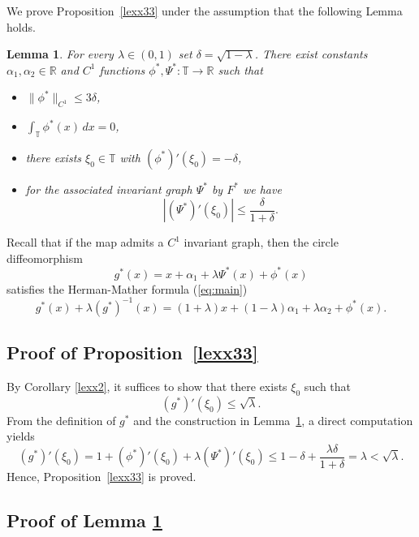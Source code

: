 \documentclass{amsart}
\newcommand{\T}{\mathbb{T}}
\newtheorem{Lemma}[Definition]{Lemma}
\begin{document}
	
	
	
	
	
	
	
	We prove Proposition~\ref{lexx33} under the assumption that the following Lemma holds.
	
	\begin{Lemma}\label{16p}
		For every $\lambda\in(0,1)$ set $\delta=\sqrt{1-\lambda}$.
		There exist constants $\alpha_1,\alpha_2\in\mathbb{R}$ and $C^1$ functions
		$\phi^*,\Psi^*:\T\to\mathbb{R}$ such that
		\begin{itemize}
			\item[(i)] $\|\phi^*\|_{C^1}\le 3\delta$,
			\item[(ii)] $\displaystyle\int_{\T}\phi^*(x)\,dx=0$,
			\item[(iii)] there exists $\xi_0\in\T$ with $\left(\phi^*\right)'(\xi_0)=-\delta$,
			\item[(iv)] for the associated invariant graph $\Psi^*$ by $F^*$ we have
			\[
			|\left(\Psi^*\right)'(\xi_0)|\le\frac{\delta}{1+\delta}.
			\]
		\end{itemize}
	\end{Lemma}
	Recall that if the map admits a $C^1$ invariant graph, then the circle diffeomorphism
	\begin{equation}\label{dfg}
		g^*(x)=x+\alpha_1+\lambda\Psi^*(x)+\phi^*(x)
	\end{equation}
	satisfies the Herman-Mather formula (\ref{eq:main})
	\begin{equation}
		g^*(x)+\lambda (g^*)^{-1}(x)=(1+\lambda)x+(1-\lambda)\alpha_1+\lambda\alpha_2+\phi^*(x).
	\end{equation}
		
		\subsection*{Proof of Proposition~\ref{lexx33}}
		By Corollary \ref{lexx2}, it suffices to show that there exists \(\xi_0\) such that
		\[
		(g^*)'(\xi_0) \leq \sqrt{\lambda}.
		\]
		From the definition of \(g^*\) and the construction in Lemma~\ref{16p}, a direct computation yields
		\[
		(g^*)'(\xi_0) = 1 + (\phi^*)'(\xi_0) + \lambda (\Psi^*)'(\xi_0) \leq 1 - \delta + \frac{\lambda \delta}{1+\delta} = \lambda < \sqrt{\lambda}.
		\]
		Hence, Proposition~\ref{lexx33} is proved.
		\subsection*{Proof of Lemma \ref{16p}}
		
\end{document}
